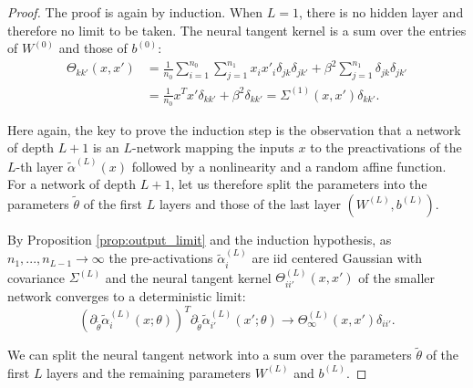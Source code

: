 \documentclass{article}
\begin{document}
\begin{proof}The proof is again by induction. When $L=1$, there is no hidden layer and therefore no limit to be taken. The neural tangent kernel is a sum over the entries of $W^{(0)}$ and those of $b^{(0)}$:
\begin{align*}
 \Theta_{kk'}(x, x') &= \frac{1}{n_0} \sum_{i=1}^{n_0} \sum_{j=1}^{n_1} x_i x'_i \delta_{jk}\delta_{jk'}  + \beta^2 \sum_{j=1}^{n_1} \delta_{jk}\delta_{jk'} \\
  &= \frac{1}{n_0} x^T x' \delta_{kk'} + \beta^2 \delta_{kk'} = \Sigma^{(1)}(x, x') \delta_{kk'}.
\end{align*}
 
Here again, the key to prove the induction step is the observation that a network of depth $L+1$ is an $L$-network mapping the inputs $x$ to the preactivations of the $L$-th layer $\tilde{\alpha}^{(L)}(x)$ followed by a nonlinearity and a random affine function. For a network of depth $ L + 1 $, let us therefore split the parameters into the parameters $\tilde{\theta}$ of the first $L$ layers and those of the last layer $(W^{(L)}, b^{(L)})$. 
 
By Proposition \ref{prop:output_limit} and the induction hypothesis, as $n_1, ..., n_{L-1} \to \infty$ the pre-activations $\tilde{\alpha}^{(L)}_i$ are iid centered  Gaussian with covariance $\Sigma^{(L)}$ and the neural tangent kernel $\Theta^{(L)}_{ii'}(x, x')$ of the smaller network converges to a deterministic limit:
$$
  \left(\partial_{\tilde{\theta}} \tilde{\alpha}^{(L)}_{i}(x;\theta)\right)^T \partial_{\tilde{\theta}} \tilde{\alpha}^{(L)}_{i'}(x';\theta) \to \Theta^{(L)}_\infty(x, x') \delta_{ii'}.
$$

We can split the neural tangent network into a sum over the parameters $\tilde{\theta}$ of the first $L$ layers and the remaining parameters $W^{(L)}$ and $b^{(L)}$. 


\end{proof}
\end{document}
